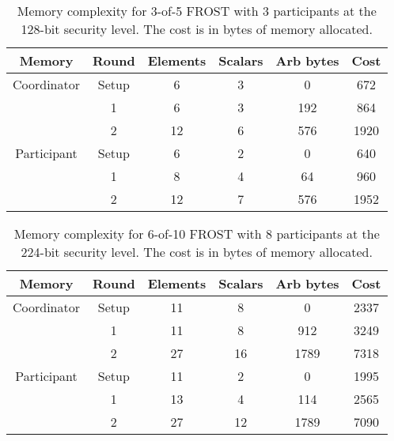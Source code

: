 \begin{table}
	\centering
	\begin{tabular}{c c c c c c}
		\toprule
		Memory & Round & Elements & Scalars & Arb bytes & Cost \\ \midrule
		Coordinator & Setup & 6 & 3 & 0 & 672 \\
		            & 1 & 6 & 3 & 192 & 864 \\
		            & 2 & 12 & 6 & 576 & 1920 \\
		\midrule
		Participant & Setup & 6 & 2 & 0 & 640 \\
		            & 1 & 8 & 4 & 64 & 960 \\
		            & 2 & 12 & 7 & 576 & 1952 \\
		\bottomrule
	\end{tabular}
	\caption{Memory complexity for 3-of-5 FROST with 3 participants at the 128-bit security level. The cost is in bytes of memory allocated.}
\end{table}

\begin{table}
	\centering
	\begin{tabular}{c c c c c c}
		\toprule
		Memory & Round & Elements & Scalars & Arb bytes & Cost \\ \midrule
		Coordinator & Setup & 11 & 8 & 0 & 2337 \\
		            & 1 & 11 & 8 & 912 & 3249 \\
		            & 2 & 27 & 16 & 1789 & 7318 \\
		\midrule
		Participant & Setup & 11 & 2 & 0 & 1995 \\
		            & 1 & 13 & 4 & 114 & 2565 \\
		            & 2 & 27 & 12 & 1789 & 7090 \\
		\bottomrule
	\end{tabular}
	\caption{Memory complexity for 6-of-10 FROST with 8 participants at the 224-bit security level. The cost is in bytes of memory allocated.}
\end{table}

